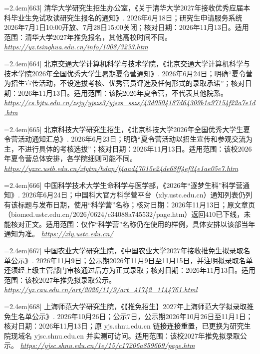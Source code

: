 \par\noindent\hangindent=2.4em\label{src:S0809}{\color{cAccent}[663]} 清华大学研究生招生办公室，《关于清华大学2027年接收优秀应届本科毕业生免试攻读研究生报名的通知》. 2026年6月18日；研究生申请服务系统2026年7月1日10:00开放、7月28日15:00关闭；核对日期：2026年11月13日。适用范围：清华大学2027年推免报名，其他高校时间不同。 \textit{\url{https://yz.tsinghua.edu.cn/info/1008/3233.htm}}\par
\par\noindent\hangindent=2.4em\label{src:S0810}{\color{cAccent}[664]} 北京交通大学计算机科学与技术学院，《北京交通大学计算机科学与技术学院2026年全国优秀大学生暑期夏令营通知》. 2026年6月24日；明确“夏令营为招生宣传活动，不设选拔考核、优秀营员评选及任何形式的录取承诺”；核对日期：2026年11月13日。适用范围：该院2026年夏令营，不代表其他院系。 \textit{\url{https://cs.bjtu.edu.cn/zsjy/yjszs3/yjszs_sszs/43d0504187d64309b1a97154f22a7e1d.htm}}\par
\par\noindent\hangindent=2.4em\label{src:S0811}{\color{cAccent}[665]} 北京科技大学研究生招生，《北京科技大学2026年全国优秀大学生夏令营活动通知汇总》. 2026年6月23日；明确“夏令营活动以招生宣传和参观交流为主，不进行具体的考核选拔”；核对日期：2026年11月13日。适用范围：该校2026年夏令营总体安排，各学院细则可能不同。 \textit{\url{https://yzxc.ustb.edu.cn/xlytm/hdap/f4aad47015e24de68ff4ef34e1ae05e7.htm}}\par
\par\noindent\hangindent=2.4em\label{src:S0812}{\color{cAccent}[666]} 中国科学技术大学生命科学与医学部，《2026年“逐梦生科”科学营通知》. 2026年6月24日；中国科大官方科学营平台（xly.ustc.edu.cn）通知列表仍列有该标题与发布日期，使用“科学营”名称；核对日期：2026年11月13日；原文章页（biomed.ustc.edu.cn/2026/0624/c34088a745532/page.htm）返回410已下线，未能核对正文。适用范围：仅作“科学营”名称仍在使用的样例，具体安排以该部当年通知为准。 \textit{\url{https://xly.ustc.edu.cn/}}\par
\par\noindent\hangindent=2.4em\label{src:S0813}{\color{cAccent}[667]} 中国农业大学研究生院，《中国农业大学2027年接收推免生拟录取名单公示》. 2026年11月9日；公示期2026年11月9日至11月15日，并注明拟录取名单还须经上级主管部门审核通过后方为正式录取；核对日期：2026年11月13日。适用范围：该校2027年推免拟录取公示。 \textit{\url{https://yz.cau.edu.cn/art/2026/11/9/art_41742_1144761.html}}\par
\par\noindent\hangindent=2.4em\label{src:S0814}{\color{cAccent}[668]} 上海师范大学研究生院，《【推免招生】2027年上海师范大学拟录取推免生名单公示》. 2026年10月26日；公示7日，公示期2026年10月26日至11月1日；核对日期：2026年11月13日；原 yjs.shnu.edu.cn 链接连接重置，已更换为研究生院现域名 yjsc.shnu.edu.cn 并实测可访问。适用范围：该校2027年推免拟录取公示。 \textit{\url{https://yjsc.shnu.edu.cn/1e/15/c17206a859669/page.htm}}\par
